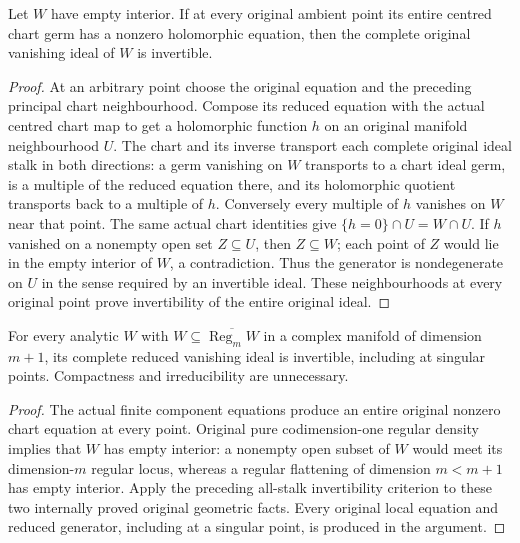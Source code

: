 \begin{lemma}
\label{hir:original-equations-empty-interior-invertible}
\leanok
Let $W$ have empty interior. If at every original ambient point its
entire centred chart germ has a nonzero holomorphic equation, then the
complete original vanishing ideal of $W$ is invertible.
\end{lemma}
\begin{proof}
At an arbitrary point choose the original equation and the preceding
principal chart neighbourhood. Compose its reduced equation with the
actual centred chart map to get a holomorphic function $h$ on an
original manifold neighbourhood $U$. The chart and its inverse transport
each complete original ideal stalk in both directions: a germ vanishing
on $W$ transports to a chart ideal germ, is a multiple of the reduced
equation there, and its holomorphic quotient transports back to a
multiple of $h$. Conversely every multiple of $h$ vanishes on $W$ near
that point. The same actual chart identities give $\{h=0\}\cap U=W\cap U$.
If $h$ vanished on a nonempty open set $Z\subseteq U$, then
$Z\subseteq W$; each point of $Z$ would lie in the empty interior of $W$,
a contradiction. Thus the generator is nondegenerate on $U$ in the
sense required by an invertible ideal. These neighbourhoods at every
original point prove invertibility of the entire original ideal.
\end{proof}

\begin{theorem}
\label{hir:pure-hypersurface-original-invertible-ideal}
\leanok
For every analytic $W$ with $W\subseteq\overline{\operatorname{Reg}_m W}$
in a complex manifold of dimension $m+1$, its complete reduced vanishing
ideal is invertible, including at singular points. Compactness and
irreducibility are unnecessary.
\end{theorem}
\begin{proof}
The actual finite component equations produce an entire original
nonzero chart equation at every point. Original pure codimension-one
regular density implies that $W$ has empty interior: a nonempty open
subset of $W$ would meet its dimension-$m$ regular locus, whereas a
regular flattening of dimension $m<m+1$ has empty interior.
Apply the preceding all-stalk invertibility criterion to these two
internally proved original geometric facts. Every original local
equation and reduced generator, including at a singular point, is
produced in the argument.
\end{proof}
